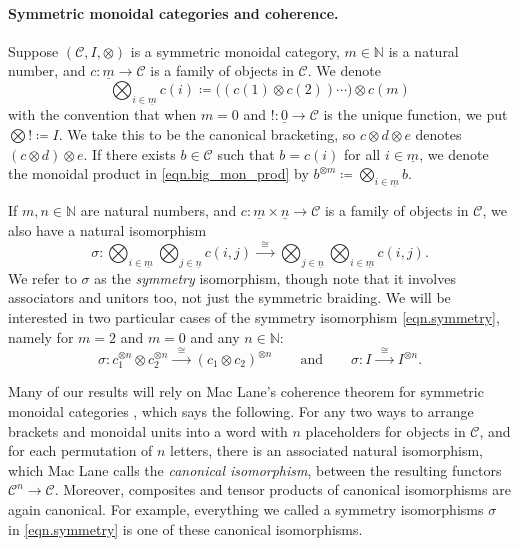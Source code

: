 \documentclass[11pt, oneside, article]{memoir}
\theoremstyle{plain}
\theoremstyle{definition}
\theoremstyle{remark}
\newcommand{\ord}[1]{\underline{#1}}%
\newcommand{\cat}[1]{\mathcal{#1}}%
\newcommand{\tpow}[1]{^{\otimes #1}}
\newcommand{\nn}{\mathbb{N}}
\newcommand{\To}[1]{\xrightarrow{#1}}
\newcommand{\Too}[1]{\To{\;\;#1\;\;}}
\newcommand{\qqand}{\qquad\text{and}\qquad}
\begin{document}
\paragraph{Symmetric monoidal categories and coherence.}
Suppose $(\cat{C}, I, \otimes)$ is a symmetric monoidal category, $m\in\nn$ is a natural number, and $c\colon\ord{m}\to\cat{C}$ is a family of objects in $\cat{C}$. We denote
\begin{equation}\label{eqn.big_mon_prod}
	\bigotimes_{i\in\ord{m}}c(i)\coloneqq
  \big((c(1)\otimes c(2))\cdots\big)\otimes c(m)
\end{equation}
with the convention that when $m=0$ and $!\colon\ord{0}\to \cat{C}$ is the unique function, we put $\bigotimes !\coloneqq I$. We take this to be the canonical bracketing, so $c\otimes d\otimes e$ denotes $(c\otimes d)\otimes e$. If there exists $b\in\cat{C}$ such that $b=c(i)$ for all $i\in\ord{m}$, we denote the monoidal product in \eqref{eqn.big_mon_prod} by $b\tpow{m}\coloneqq\bigotimes_{i\in\ord{m}}b$. 

If $m,n\in\nn$ are natural numbers, and $c\colon \ord{m}\times \ord{n}\to\cat{C}$ is a family of objects in $\cat{C}$, we also have a natural isomorphism
\begin{equation}\label{eqn.symmetry}
\sigma\colon
\bigotimes_{i\in\ord{m}}\bigotimes_{j\in\ord{n}}c(i,j)\Too{\cong}
\bigotimes_{j\in\ord{n}}\bigotimes_{i\in\ord{m}}c(i,j).
\end{equation}
We refer to $\sigma$ as the \emph{symmetry} isomorphism, though note that it involves associators and unitors too, not just the symmetric braiding. We will be interested in two particular cases of the symmetry isomorphism \cref{eqn.symmetry}, namely for $m=2$ and $m=0$ and any $n\in\nn$:
\[\sigma\colon c_1\tpow{n}\otimes c_2\tpow{n}\Too{\cong}(c_1\otimes c_2)\tpow{n}
\qqand
\sigma\colon I\Too{\cong} I\tpow{n}.
\]

Many of our results will rely on Mac Lane's coherence theorem for symmetric monoidal categories \cite[Theorem XI.1]{MacLane:1998a}, which says the following. For any two ways to arrange brackets and monoidal units into a word with $n$ placeholders for objects in $\cat{C}$, and for each permutation of $n$ letters, there is an associated natural isomorphism, which Mac Lane calls the \emph{canonical isomorphism}, between the resulting functors $\cat{C}^n\to\cat{C}$. Moreover, composites and tensor products of canonical isomorphisms are again canonical. For example, everything we called a symmetry isomorphisms $\sigma$ in \cref{eqn.symmetry} is one of these canonical isomorphisms.
\end{document}
